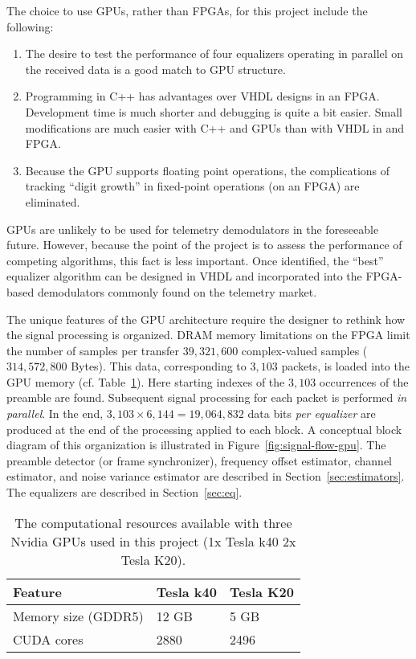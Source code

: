 The choice to use GPUs, rather than FPGAs, for this project include the following:
\begin{enumerate}
	\item The desire to test the performance of four equalizers operating in parallel on the
		received data is a good match to GPU structure.
	\item Programming in C++ has advantages over VHDL designs in an FPGA.
		Development time is much shorter and debugging is quite a bit easier.
		Small modifications are much easier with C++ and GPUs than with VHDL in and FPGA.
	\item  Because the GPU supports floating point operations, the complications of tracking
		``digit growth'' in fixed-point operations (on an FPGA) are eliminated.
\end{enumerate}
GPUs are unlikely to be used for telemetry demodulators in the foreseeable future.
However, because the point of the project is to assess the performance of competing algorithms,
this fact is less important.
Once identified, the ``best'' equalizer algorithm can be designed in VHDL and incorporated
into the FPGA-based demodulators commonly found on the telemetry market.

The unique features of the GPU architecture require the designer to rethink how the
signal processing is organized.
DRAM memory limitations on the FPGA limit the number of samples per transfer $39{,}321{,}600$
complex-valued samples ($314{,}572{,}800$ Bytes).
This data, corresponding to $3{,}103$ packets,
is loaded into the GPU memory (cf. Table~\ref{tab:gpu-resources}).
Here starting indexes of the $3{,}103$ occurrences of the preamble are found.
Subsequent signal processing for each packet is performed \textit{in parallel}.
In the end, $3{,}103 \times 6{,}144 = 19{,}064{,}832$ data bits \textit{per equalizer}
are produced at the end of the processing applied to each block.
A conceptual block diagram of this organization is illustrated in Figure~\ref{fig:signal-flow-gpu}.
The preamble detector (or frame synchronizer), frequency offset estimator, channel estimator, and
noise variance estimator are described in Section~\ref{sec:estimators}.
The equalizers are described in Section~\ref{sec:eq}.


\begin{table}
\caption{The computational resources available with three Nvidia GPUs used in this project (1x Tesla k40 2x Tesla K20).}
\label{tab:gpu-resources}
\begin{center}
\begin{tabular}{lll}
	\toprule
	Feature & Tesla k40 & Tesla K20 \\ \midrule
	Memory size (GDDR5) & 12 GB & 5 GB \\
	CUDA cores & 2880 & 2496 \\ \bottomrule
\end{tabular}
\end{center}
\end{table}
